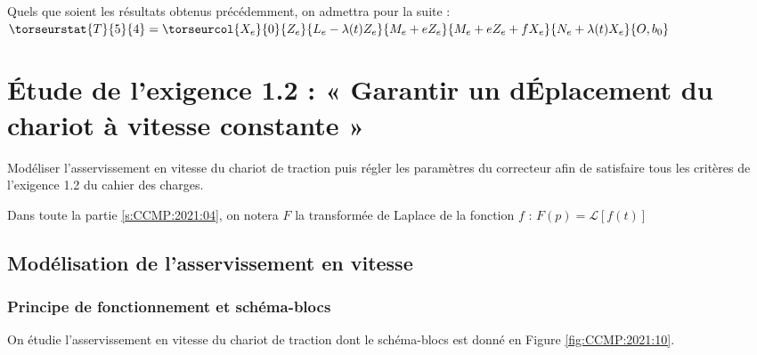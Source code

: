 Quels que soient les résultats obtenus précédemment, on admettra pour la suite :
$\torseurstat{T}{5}{4}=\torseurcol{X_e}{0}{Z_e}{L_e-\lambda(t)Z_e}{M_e + eZ_e}{M_e+eZ_e + fX_e}{N_e + \lambda(t)X_e}{O,b_0}$

\ifprof
\begin{corrige}
\end{corrige}
\else
\fi

\ifprof
\begin{corrige}
\end{corrige}
\else
\fi

\section{\label{s:CCMP:2021:04}Étude de l'exigence 1.2 : « Garantir un dÉplacement du chariot à vitesse constante »}
\begin{obj}
Modéliser l'asservissement en vitesse du chariot de traction puis régler les paramètres du correcteur afin de satisfaire tous les critères de l'exigence 1.2 du cahier des charges.
\end{obj}

Dans toute la partie \ref{s:CCMP:2021:04}, on notera $F$ la transformée de Laplace de la fonction $f$ :	$F(p)=\mathcal{L}\left[f(t)\right]$
\subsection{Modélisation de l'asservissement en vitesse}

\subsubsection*{Principe de fonctionnement et schéma-blocs}

On étudie l'asservissement en vitesse du chariot de traction dont le schéma-blocs est donné en Figure \ref{fig:CCMP:2021:10}.


